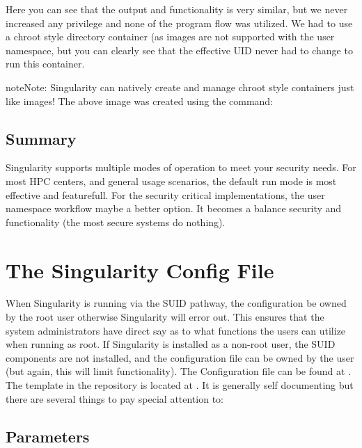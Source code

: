 \documentclass[letterpaper,10pt,english]{sphinxmanual}
\begin{document}
Here you can see that the output and functionality is very similar,
but we never increased any privilege and none of the  program flow was
utilized. We had to use a chroot style directory container (as images
are not supported with the user namespace, but you can clearly see
that the effective UID never had to change to run this container.

\begin{sphinxadmonition}{note}{Note:}
Singularity can natively create and manage chroot style
containers just like images! The above image was created using the
command: 
\end{sphinxadmonition}


\section{Summary}
\label{\detokenize{security:summary}}
Singularity supports multiple modes of operation to meet your security
needs. For most HPC centers, and general usage scenarios, the default
run mode is most effective and featurefull. For the security critical
implementations, the user namespace workflow maybe a better option. It
becomes a balance security and functionality (the most secure systems do
nothing).


\chapter{The Singularity Config File}
\label{\detokenize{the_singularity_config_file:the-singularity-config-file}}\label{\detokenize{the_singularity_config_file::doc}}
When Singularity is running via the SUID pathway, the configuration
 be owned by the root user otherwise Singularity will error
out. This ensures that the system administrators have direct say as to
what functions the users can utilize when running as root. If
Singularity is installed as a non-root user, the SUID components are
not installed, and the configuration file can be owned by the user
(but again, this will limit functionality).
The Configuration file can be found at . The template in the
repository is located at . It is generally self documenting but there
are several things to pay special attention to:


\section{Parameters}
\label{\detokenize{the_singularity_config_file:parameters}}
\end{document}
